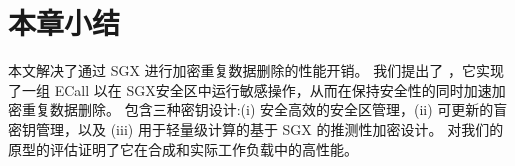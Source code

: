 \section{本章小结}
\label{sec:sgxdedup-conclusion}

本文解决了通过 SGX 进行加密重复数据删除的性能开销。 我们提出了 \sysnameS，它实现了一组 ECall 以在 SGX安全区中运行敏感操作，从而在保持安全性的同时加速加密重复数据删除。 \sysnameS 包含三种密钥设计:(i) 安全高效的安全区管理，(ii) 可更新的盲密钥管理，以及 (iii) 用于轻量级计算的基于 SGX 的推测性加密设计。 对我们的 \sysnameS 原型的评估证明了它在合成和实际工作负载中的高性能。